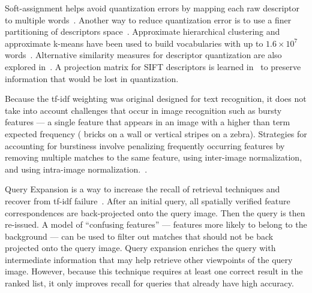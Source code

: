             Soft-assignment helps avoid quantization errors by mapping each raw descriptor to multiple
            words~\cite{philbin_lost_2008}. Another way to reduce quantization error is to use a finer partitioning
            of descriptors space~\cite{philbin_object_2007}. Approximate hierarchical clustering and approximate
            k-means have been used to build vocabularies with up to $1.6 \times 10^7$
            words~\cite{nister_scalable_2006, philbin_object_2007, mikulik_learning_2010}. Alternative similarity
            measures for descriptor quantization are also explored in~\cite{mikulik_learning_2010}.
            A projection matrix for SIFT descriptors is learned in~\cite{philbin_descriptor_2010} to preserve
            information that would be lost in quantization.

            Because the tf-idf weighting was original designed for text recognition, it does not take into account
            challenges that occur in image recognition such as bursty features --- a single feature that appears in
            an image with a higher than term expected frequency (\eg{} bricks on a wall or vertical stripes on a
            zebra). Strategies for accounting for burstiness involve penalizing frequently occurring features by
            removing multiple matches to the same feature, using inter-image normalization, and using intra-image
            normalization.~\cite{jegou_burstiness_2009}.
            
            Query Expansion is a way to increase the recall of retrieval techniques and recover from tf-idf
            failure~\cite{chum_total_2007, chum_total_2011, arandjelovic_three_2012, tolias_visual_2014}. After an
            initial query, all spatially verified feature correspondences are back-projected onto the query image.
            Then the query is then re-issued. A model of ``confusing features'' --- features more likely to belong
            to the background --- can be used to filter out matches that should not be back projected onto the
            query image. Query expansion enriches the query with intermediate information that may help retrieve
            other viewpoints of the query image. However, because this technique requires at least one correct
            result in the ranked list, it only improves recall for queries that already have high accuracy.

